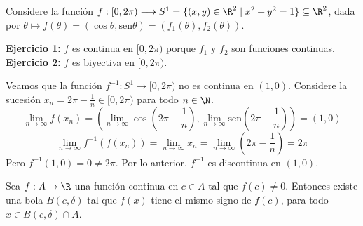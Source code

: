 \begin{example}
Considere la función $f:[0,2\pi)\longrightarrow S^{1}=\{(x,y)\in\R^{2} \mid x^{2}+y^{2}=1\} \subseteq \R^{2}$, %
dada por $\theta\mapsto f(\theta)=(\cos\theta, \mathrm{sen}\theta) = (f_1(\theta), f_2(\theta))$. %
\begin{center}
\end{center}

\textbf{Ejercicio 1:} $f$ es continua en $[0,2\pi)$ porque $f_1$ y $f_2$ son funciones continuas. %
\textbf{Ejercicio 2:} $f$ es biyectiva en $[0, 2\pi)$. %

Veamos que la función $f^{-1}:S^{1}\rightarrow [0,2\pi)$ no es continua en $(1,0)$. %
Considere la sucesión $x_n = 2\pi-\frac{1}{n} \in [0,2\pi)$ para todo $n \in \N$. %
$$ \lim_{n\rightarrow\infty}f(x_{n}) = \left(\lim_{n\rightarrow\infty}\cos\left(2\pi-\frac{1}{n}\right), \lim_{n\rightarrow\infty}\mathrm{sen}\left(2\pi-\frac{1}{n}\right)\right) = (1,0) $$ %
$$ \lim_{n\rightarrow\infty}f^{-1}(f(x_{n})) = \lim_{n\rightarrow\infty}x_{n} = \lim_{n\rightarrow\infty} \left(2\pi-\frac{1}{n}\right) = 2\pi $$ %
Pero $f^{-1}(1,0)=0 \neq 2\pi$. Por lo anterior, $f^{-1}$ es discontinua en $(1,0)$. %
\end{example}

\begin{teorema}
Sea $f: A \to \R$ una función continua en $c \in A$ tal que $f(c)\neq 0$. Entonces existe una bola $B(c,\delta)$ tal que $f(x)$ tiene el mismo signo de $f(c)$, para todo $x \in B(c,\delta)\cap A$. %
\end{teorema}

